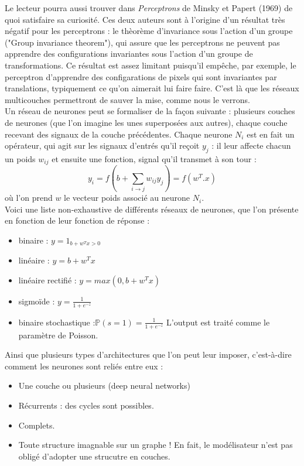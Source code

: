 \documentclass{article}
\theoremstyle{definition}
\begin{document}
Le lecteur pourra aussi trouver dans \textit{Perceptrons} de Minsky et Papert (1969) de quoi satisfaire sa curiosité. Ces deux auteurs sont à l'origine d'un résultat très négatif pour les perceptrons : le thèorème d'invariance sous l'action d'un groupe ("Group invariance theorem"), qui assure que les perceptrons ne peuvent pas apprendre des configurations invariantes sous l'action d'un groupe de transformations. Ce résultat est assez limitant puisqu'il empêche, par exemple, le perceptron d'apprendre des configarations de pixels qui sont invariantes par translations, typiquement ce qu'on aimerait lui faire faire. C'est là que les réseaux multicouches permettront de sauver la mise, comme nous le verrons.\\

Un réseau de neurones peut se formaliser de la façon suivante : plusieurs couches de neurones (que l'on imagine les unes superposées aux autres), chaque couche recevant des signaux de la couche précédentes. Chaque neurone $N_i$ est en fait un opérateur, qui agit sur les signaux d'entrés qu'il reçoit $y_j$ : il leur affecte chacun un poids $w_{ij}$ et ensuite une fonction, signal qu'il transmet à son tour :
\[y_i=f(b+\sum_{i\rightarrow j}w_{ij}y_j)=f(w^T.x)\]
où l'on prend $w$ le vecteur poids associé au neurone $N_i$.\\

Voici une liste non-exhaustive de différents réseaux de neurones, que l'on présente en fonction de leur fonction de réponse :
\begin{itemize}
\item binaire : $y=1_{b+w^Tx>0}$
\item linéaire : $y=b+w^Tx$
\item linéaire rectifié : $y=max(0,b+w^Tx)$
\item sigmoïde : $y=\frac{1}{1+e^{-z}}$
\item binaire stochastique :$\mathbb P(s=1)=\frac{1}{1+e^{-z}}$ L'output est traité comme le paramètre de Poisson.\\
\end{itemize}

Ainsi que plusieurs types d'architectures que l'on peut leur imposer, c'est-à-dire comment les neurones sont reliés entre eux :
\begin{itemize}
\item Une couche ou plusieurs (deep neural networks)
\item Récurrents : des cycles sont possibles.
\item Complets.
\item Toute structure imagnable sur un graphe ! En fait, le modélisateur n'est pas obligé d'adopter une strucutre en couches.\\
\end{itemize}
\end{document}
